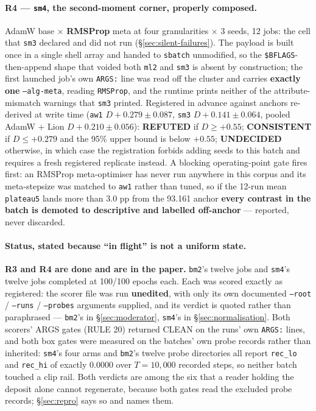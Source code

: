 \documentclass[10pt,letterpaper]{article}
\newcommand{\Dstat}{D}                         %
\newcommand{\plateau}{\texttt{plateau5}}
\newcommand{\arm}[1]{\texttt{#1}}
\begin{document}
\paragraph{R4 --- \arm{sm4}, the second-moment corner, properly composed.}
AdamW base $\times$ \textbf{RMSProp} meta \citep{tieleman2012rmsprop} at four granularities
$\times$ 3 seeds, 12 jobs: the cell that \arm{sm3} declared and did not run
(\S\ref{sec:silent-failures}). The payload is built once in a single shell array and handed to
\texttt{sbatch} unmodified, so the \texttt{\$BFLAGS}-then-append shape that voided both
\arm{ml2} and \arm{sm3} is absent by construction; the first launched job's own \texttt{ARGS:}
line was read off the cluster and carries \textbf{exactly one} \texttt{--alg-meta}, reading
\texttt{RMSProp}, and the runtime prints neither of the attribute-mismatch warnings that
\arm{sm3} printed. Registered in advance against anchors re-derived at write time
(\arm{aw1} $\Dstat +0.279 \pm 0.087$, \arm{sm3} $\Dstat +0.141 \pm 0.064$, pooled AdamW + Lion
$\Dstat +0.210 \pm 0.056$): \textbf{REFUTED} if $\Dstat \ge +0.55$; \textbf{CONSISTENT} if
$\Dstat \le +0.279$ and the 95\% upper bound is below $+0.55$; \textbf{UNDECIDED} otherwise, in
which case the registration forbids adding seeds to this batch and requires a fresh registered
replicate instead. A blocking operating-point gate fires first: an RMSProp meta-optimiser has
never run anywhere in this corpus and its meta-stepsize was matched to \arm{aw1} rather than
tuned, so if the 12-run mean \plateau{} lands more than 3.0 pp from the 93.161 anchor
\textbf{every contrast in the batch is demoted to descriptive and labelled off-anchor} ---
reported, never discarded.

\paragraph{Status, stated because ``in flight'' is not a uniform state.}
\textbf{R3 and R4 are done and are in the paper.} \arm{bm2}'s twelve jobs and \arm{sm4}'s twelve
jobs completed at 100/100 epochs each. Each was scored exactly as registered: the scorer file was
run \textbf{unedited}, with only its own documented \texttt{--root} / \texttt{--runs} /
\texttt{--probes} arguments supplied, and its verdict is quoted rather than paraphrased ---
\arm{bm2}'s in \S\ref{sec:moderator}, \arm{sm4}'s in \S\ref{sec:normalisation}. Both scorers'
ARGS gates (RULE 20) returned CLEAN on the runs' own \texttt{ARGS:} lines, and both box gates
were measured on the batches' own probe records rather than inherited: \arm{sm4}'s four arms and
\arm{bm2}'s twelve probe directories all report \texttt{rec\_lo} and \texttt{rec\_hi} of exactly
0.0000 over $T = 10{,}000$ recorded steps, so neither batch touched a clip rail. Both verdicts
are among the six that a reader holding the deposit alone cannot regenerate, because both gates
read the excluded probe records; \S\ref{sec:repro} says so and names them.
\end{document}
